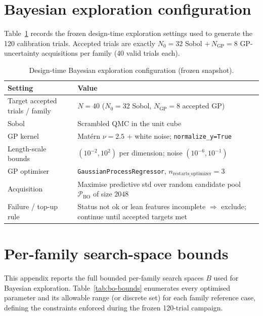 \documentclass[a4paper,fleqn]{cas-dc}
\begin{document}
{\section{Bayesian exploration configuration}\label{app:bo-config}

Table~\ref{tab:bo-config} records the frozen design-time exploration settings
used to generate the 120 calibration trials. Accepted trials are exactly
$N_0{=}32$ Sobol $+\,N_{\mathrm{GP}}{=}8$ GP-uncertainty acquisitions per family
(40 valid trials each).

\begin{table}[t]
\caption{Design-time Bayesian exploration configuration (frozen snapshot).}\label{tab:bo-config}
\begin{tabular*}{\textwidth}{@{\extracolsep{\fill}} l l @{}}
\toprule
Setting & Value \\
\midrule
Target accepted trials / family & $N{=}40$ ($N_0{=}32$ Sobol, $N_{\mathrm{GP}}{=}8$ accepted GP) \\
Sobol & Scrambled QMC in the unit cube \\
GP kernel & Mat\'{e}rn $\nu{=}2.5$ $+$ white noise; \texttt{normalize\_y=True} \\
Length-scale bounds & $(10^{-2},10^{2})$ per dimension; noise $(10^{-6},10^{-1})$ \\
GP optimiser & \texttt{GaussianProcessRegressor}, $n_{\mathrm{restarts\_optimizer}}{=}3$ \\
Acquisition & Maximise predictive std over random candidate pool $\mathcal{P}_{\mathrm{BO}}$ of size $2048$ \\
Failure / top-up rule & Status not ok or lean features incomplete $\Rightarrow$ exclude; continue until accepted targets met \\
\bottomrule
\end{tabular*}
\end{table}

\section{Per-family search-space bounds}\label{app:search-bounds}

This appendix reports the full bounded per-family search spaces $B$ used for Bayesian exploration. Table~\ref{tab:bo-bounds} enumerates every optimised parameter and its allowable range (or discrete set) for each family reference case, defining the constraints enforced during the frozen 120-trial campaign.

}
\end{document}
